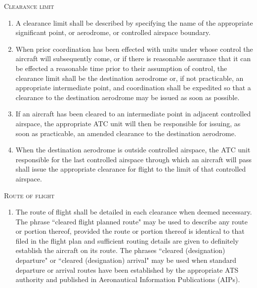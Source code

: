 \documentclass[../vATM.tex]{subfiles}
\begin{document}
    \begin{enumeratesc}
        \item \textsc{Clearance limit}
        \begin{enumerate}
            \item A clearance limit shall be described by specifying the name of the appropriate significant point, or aerodrome, or controlled airspace boundary.
            \item When prior coordination has been effected with units under whose control the aircraft will subsequently come, or if there is reasonable assurance that it can be effected a reasonable time prior to their assumption of control, the clearance limit shall be the destination aerodrome or, if not practicable, an appropriate intermediate point, and coordination shall be expedited so that a clearance to the destination aerodrome may be issued as soon as possible.
            \item If an aircraft has been cleared to an intermediate point in adjacent controlled airspace, the appropriate ATC unit will then be responsible for issuing, as soon as practicable, an amended clearance to the destination aerodrome.
            \item When the destination aerodrome is outside controlled airspace, the ATC unit responsible for the last controlled airspace through which an aircraft will pass shall issue the appropriate clearance for flight to the limit of that controlled airspace.
        \end{enumerate}

        \item \textsc{Route of flight}
        \begin{enumerate}
            \item The route of flight shall be detailed in each clearance when deemed necessary. The phrase ``cleared flight planned route" may be used to describe any route or portion thereof, provided the route or portion thereof is identical to that filed in the flight plan and sufficient routing details are given to definitely establish the aircraft on its route. The phrases ``cleared (designation) departure" or ``cleared (designation) arrival" may be used when standard departure or arrival routes have been established by the appropriate ATS authority and published in Aeronautical Information Publications (AIPs).



\end{enumerate}
\end{enumeratesc}
\end{document}

